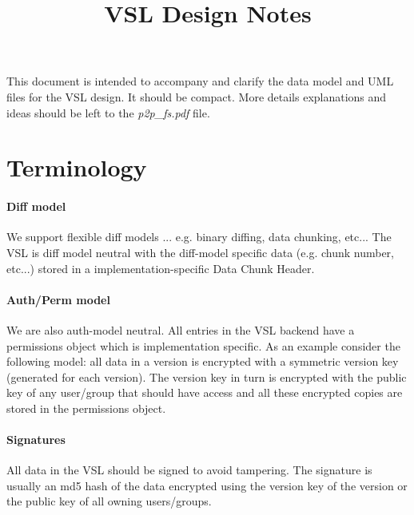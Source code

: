\documentclass[10pt]{article}
\begin{document}
\title{VSL Design Notes}
\author{}
\maketitle



%
%


%
%

\tableofcontents
\newpage

This document is intended to accompany and clarify the data model and UML files for the VSL design.  It should be compact.  More details explanations and ideas should be left to the {\em p2p\_fs.pdf} file.

\section{Terminology}

\paragraph{Diff model} 

We support flexible diff models ... e.g. binary diffing, data chunking, etc...  The VSL is diff model neutral with the diff-model specific data (e.g. chunk number, etc...) stored in a implementation-specific Data Chunk Header.

\paragraph{Auth/Perm model}

We are also auth-model neutral.  All entries in the VSL backend have a permissions object which is implementation specific.  As an example consider the following model:  all data in a version is encrypted with a symmetric version key (generated for each version).  The version key in turn is encrypted with the public key of any user/group that should have access and all these encrypted copies are stored in the permissions object.  

\paragraph{Signatures}

All data in the VSL should be signed to avoid tampering.  The signature is usually an md5 hash of the data encrypted using the version key of the version or the public key of all owning users/groups.
\end{document}
